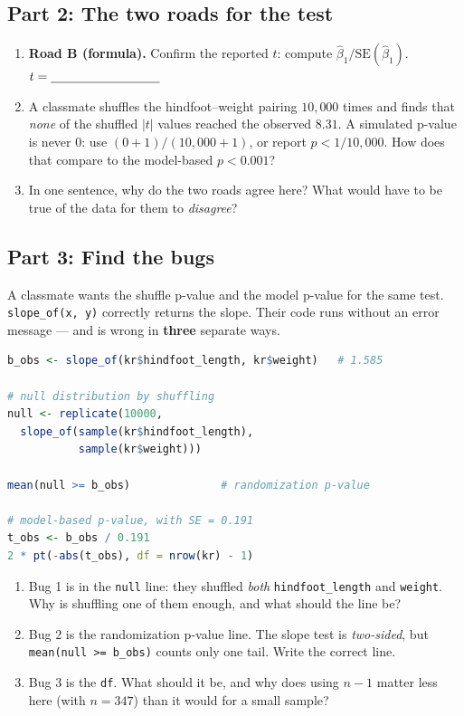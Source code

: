 \documentclass{article}
\newcommand{\blankline}[1]{\underline{\hspace{#1}}}
\begin{document}
\subsection*{Part 2: The two roads for the test}

\begin{enumerate}[label={\bfseries (\Alph*)},itemsep=.8em]
\item \textbf{Road B (formula).} Confirm the reported $t$: compute $\hat\beta_1 / \mathrm{SE}(\hat\beta_1)$. \hfill $t = \blankline{1.2in}$ \\[1.5em]
\item A classmate shuffles the hindfoot--weight pairing $10{,}000$ times and finds that \emph{none} of the shuffled $|t|$ values reached the observed $8.31$. A simulated p-value is never $0$: use $(0+1)/(10{,}000+1)$, or report $p < 1/10{,}000$. How does that compare to the model-based $p < 0.001$? \\[3em]
\item In one sentence, why do the two roads agree here? What would have to be true of the data for them to \emph{disagree}? \\[3.5em]
\end{enumerate}

\newpage

\subsection*{Part 3: Find the bugs}
A classmate wants the shuffle p-value and the model p-value for the same test. \texttt{slope\_of(x, y)} correctly returns the slope. Their code runs without an error message --- and is wrong in \textbf{three} separate ways.

\begin{lstlisting}[language=R]
b_obs <- slope_of(kr$hindfoot_length, kr$weight)   # 1.585

# null distribution by shuffling
null <- replicate(10000,
  slope_of(sample(kr$hindfoot_length),
           sample(kr$weight)))

mean(null >= b_obs)              # randomization p-value

# model-based p-value, with SE = 0.191
t_obs <- b_obs / 0.191
2 * pt(-abs(t_obs), df = nrow(kr) - 1)
\end{lstlisting}

\begin{enumerate}[label={\bfseries (\Alph*)},itemsep=.8em]
\item Bug 1 is in the \texttt{null} line: they shuffled \emph{both} \texttt{hindfoot\_length} and \texttt{weight}. Why is shuffling one of them enough, and what should the line be? \\[3.5em]
\item Bug 2 is the randomization p-value line. The slope test is \emph{two-sided}, but \texttt{mean(null >= b\_obs)} counts only one tail. Write the correct line. \\[3.5em]
\item Bug 3 is the \texttt{df}. What should it be, and why does using $n-1$ matter less here (with $n = 347$) than it would for a small sample? \\[3.5em]
\end{enumerate}
\end{document}
